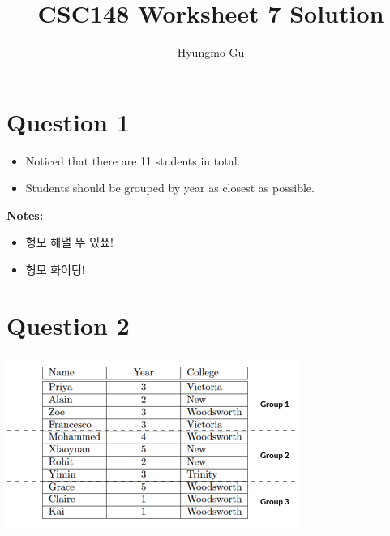 \documentclass[12pt]{article}
\begin{document}
\title{CSC148 Worksheet 7 Solution}
\author{Hyungmo Gu}
\maketitle

\section*{Question 1}

\begin{itemize}
    \item Noticed that there are 11 students in total.
    \item Students should be grouped by year as closest as possible.
\end{itemize}

\bigskip

\textbf{Notes:}

\begin{itemize}
    \item 형모 해낼 뚜 있쬬!
    \item 형모 화이팅!
\end{itemize}

\section*{Question 2}
\begin{center}
\includegraphics[width=0.7\linewidth]{images/worksheet_7_q2_solution.png}
\end{center}
\end{document}
